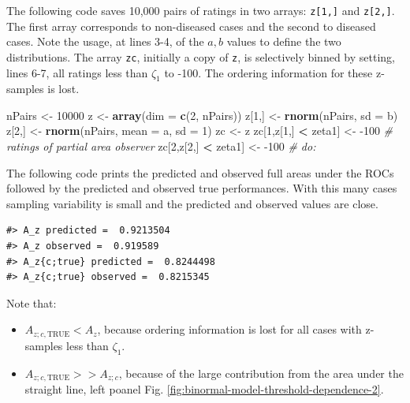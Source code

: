 \documentclass[
]{book}
\newenvironment{Shaded}{\begin{snugshade}}{\end{snugshade}}
\newcommand{\CommentTok}[1]{\textcolor[rgb]{0.56,0.35,0.01}{\textit{#1}}}
\newcommand{\DataTypeTok}[1]{\textcolor[rgb]{0.13,0.29,0.53}{#1}}
\newcommand{\DecValTok}[1]{\textcolor[rgb]{0.00,0.00,0.81}{#1}}
\newcommand{\KeywordTok}[1]{\textcolor[rgb]{0.13,0.29,0.53}{\textbf{#1}}}
\newcommand{\NormalTok}[1]{#1}
\newcommand{\OperatorTok}[1]{\textcolor[rgb]{0.81,0.36,0.00}{\textbf{#1}}}
\newcommand{\StringTok}[1]{\textcolor[rgb]{0.31,0.60,0.02}{#1}}
\providecommand{\tightlist}{%
  \setlength{\itemsep}{0pt}\setlength{\parskip}{0pt}}
\begin{document}
The following code saves 10,000 pairs of ratings in two arrays: \texttt{z{[}1,{]}} and \texttt{z{[}2,{]}}. The first array corresponds to non-diseased cases and the second to diseased cases. Note the usage, at lines 3-4, of the \(a,b\) values to define the two distributions. The array \texttt{zc}, initially a copy of \texttt{z}, is selectively binned by setting, lines 6-7, all ratings less than \(\zeta_1\) to -100. The ordering information for these z-samples is lost.

\begin{Shaded}
\begin{Highlighting}[numbers=left,,]
\NormalTok{nPairs <-}\StringTok{ }\DecValTok{10000}
\NormalTok{z <-}\StringTok{ }\KeywordTok{array}\NormalTok{(}\DataTypeTok{dim =} \KeywordTok{c}\NormalTok{(}\DecValTok{2}\NormalTok{, nPairs))}
\NormalTok{z[}\DecValTok{1}\NormalTok{,] <-}\StringTok{ }\KeywordTok{rnorm}\NormalTok{(nPairs, }\DataTypeTok{sd =}\NormalTok{ b)}
\NormalTok{z[}\DecValTok{2}\NormalTok{,] <-}\StringTok{ }\KeywordTok{rnorm}\NormalTok{(nPairs, }\DataTypeTok{mean =}\NormalTok{ a, }\DataTypeTok{sd =} \DecValTok{1}\NormalTok{)}
\NormalTok{zc <-}\StringTok{ }\NormalTok{z}
\NormalTok{zc[}\DecValTok{1}\NormalTok{,z[}\DecValTok{1}\NormalTok{,] }\OperatorTok{<}\StringTok{ }\NormalTok{zeta1] <-}\StringTok{ }\DecValTok{-100} \CommentTok{# ratings of partial area observer}
\NormalTok{zc[}\DecValTok{2}\NormalTok{,z[}\DecValTok{2}\NormalTok{,] }\OperatorTok{<}\StringTok{ }\NormalTok{zeta1] <-}\StringTok{ }\DecValTok{-100} \CommentTok{# do:}
\end{Highlighting}
\end{Shaded}

The following code prints the predicted and observed full areas under the ROCs followed by the predicted and observed true performances. With this many cases sampling variability is small and the predicted and observed values are close.

\begin{verbatim}
#> A_z predicted =  0.9213504 
#> A_z observed =  0.919589
#> A_z{c;true} predicted =  0.8244498 
#> A_z{c;true} observed =  0.8215345
\end{verbatim}

Note that:

\begin{itemize}
\tightlist
\item
  \(A_{z;c,\text{TRUE}} < A_z\), because ordering information is lost for all cases with z-samples less than \(\zeta_1\).
\item
  \(A_{z;c,\text{TRUE}} >> A_{z;c}\), because of the large contribution from the area under the straight line, left poanel Fig. \ref{fig:binormal-model-threshold-dependence-2}.
\end{itemize}
\end{document}
